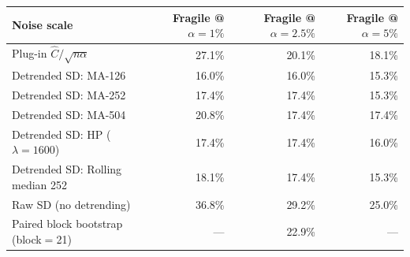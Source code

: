 \begin{tabular}{lrrr}
\toprule
Noise scale & Fragile @ $\alpha{=}1\%$ & Fragile @ $\alpha{=}2.5\%$ & Fragile @ $\alpha{=}5\%$ \\
\midrule
  Plug-in $\hat{C}/\!\sqrt{n\alpha}$ & 27.1\% & 20.1\% & 18.1\% \\
\midrule
  Detrended SD: MA-126 & 16.0\% & 16.0\% & 15.3\% \\
  Detrended SD: MA-252 & 17.4\% & 17.4\% & 15.3\% \\
  Detrended SD: MA-504 & 20.8\% & 17.4\% & 17.4\% \\
  Detrended SD: HP ($\lambda{=}1600$) & 17.4\% & 17.4\% & 16.0\% \\
  Detrended SD: Rolling median 252 & 18.1\% & 17.4\% & 15.3\% \\
  Raw SD (no detrending) & 36.8\% & 29.2\% & 25.0\% \\
\midrule
  Paired block bootstrap (block${=}$21) & --- & 22.9\% & --- \\
\bottomrule
\end{tabular}